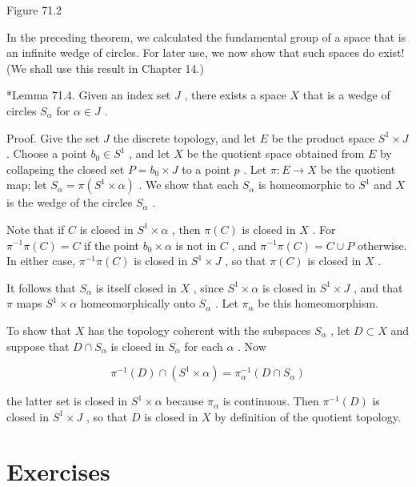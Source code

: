 \documentclass[10pt]{article}
\begin{document}
Figure 71.2

In the preceding theorem, we calculated the fundamental group of a space that is an infinite wedge of circles. For later use, we now show that such spaces do exist! (We shall use this result in Chapter 14.)

*Lemma 71.4. Given an index set \(J\) , there exists a space \(X\) that is a wedge of circles \({S}_{\alpha }\) for \(\alpha  \in  J\) .

Proof. Give the set \(J\) the discrete topology, and let \(E\) be the product space \({S}^{1} \times  J\) . Choose a point \({b}_{0} \in  {S}^{1}\) , and let \(X\) be the quotient space obtained from \(E\) by collapsing the closed set \(P = {b}_{0} \times  J\) to a point \(p\) . Let \(\pi  : E \rightarrow  X\) be the quotient map; let \({S}_{\alpha } = \pi \left( {{S}^{1} \times  \alpha }\right)\) . We show that each \({S}_{\alpha }\) is homeomorphic to \({S}^{1}\) and \(X\) is the wedge of the circles \({S}_{\alpha }\) .

Note that if \(C\) is closed in \({S}^{1} \times  \alpha\) , then \(\pi \left( C\right)\) is closed in \(X\) . For \({\pi }^{-1}\pi \left( C\right)  = C\) if the point \({b}_{0} \times  \alpha\) is not in \(C\) , and \({\pi }^{-1}\pi \left( C\right)  = C \cup  P\) otherwise. In either case, \({\pi }^{-1}\pi \left( C\right)\) is closed in \({S}^{1} \times  J\) , so that \(\pi \left( C\right)\) is closed in \(X\) .

It follows that \({S}_{\alpha }\) is itself closed in \(X\) , since \({S}^{1} \times  \alpha\) is closed in \({S}^{1} \times  J\) , and that \(\pi\) maps \({S}^{1} \times  \alpha\) homeomorphically onto \({S}_{\alpha }\) . Let \({\pi }_{\alpha }\) be this homeomorphism.

To show that \(X\) has the topology coherent with the subspaces \({S}_{\alpha }\) , let \(D \subset  X\) and suppose that \(D \cap  {S}_{\alpha }\) is closed in \({S}_{\alpha }\) for each \(\alpha\) . Now

\[
{\pi }^{-1}\left( D\right)  \cap  \left( {{S}^{1} \times  \alpha }\right)  = {\pi }_{\alpha }^{-1}\left( {D \cap  {S}_{\alpha }}\right)
\]

the latter set is closed in \({S}^{1} \times  \alpha\) because \({\pi }_{\alpha }\) is continuous. Then \({\pi }^{-1}\left( D\right)\) is closed in \({S}^{1} \times  J\) , so that \(D\) is closed in \(X\) by definition of the quotient topology.

\section*{Exercises}
\end{document}
